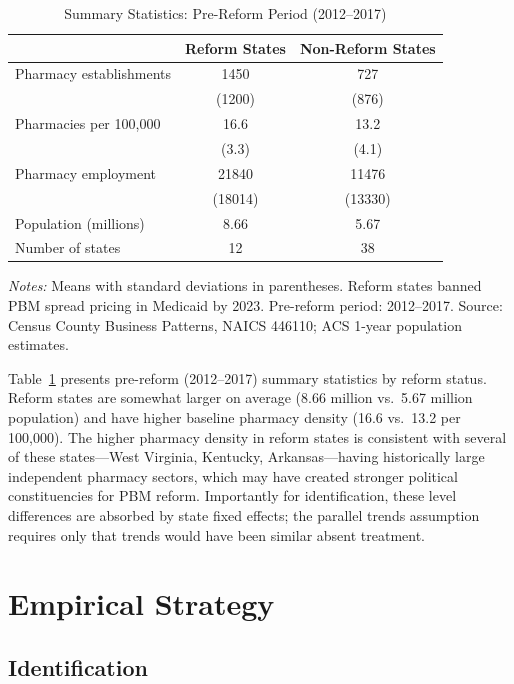 \documentclass[12pt]{article}
\begin{document}
\begin{table}[htbp]
\centering
\caption{Summary Statistics: Pre-Reform Period (2012--2017)}
\label{tab:summary}
\begin{threeparttable}
\begin{tabular}{lcc}
\toprule
 & Reform States & Non-Reform States \\
\midrule
Pharmacy establishments & 1450 & 727 \\
 & (1200) & (876) \\
Pharmacies per 100,000 & 16.6 & 13.2 \\
 & (3.3) & (4.1) \\
Pharmacy employment & 21840 & 11476 \\
 & (18014) & (13330) \\
Population (millions) & 8.66 & 5.67 \\
Number of states & 12 & 38 \\
\bottomrule
\end{tabular}
\begin{tablenotes}[flushleft]\small
\item \textit{Notes:} Means with standard deviations in parentheses. Reform states banned PBM spread pricing in Medicaid by 2023. Pre-reform period: 2012--2017. Source: Census County Business Patterns, NAICS 446110; ACS 1-year population estimates.
\end{tablenotes}
\end{threeparttable}
\end{table}

Table~\ref{tab:summary} presents pre-reform (2012--2017) summary statistics by reform status. Reform states are somewhat larger on average (8.66 million vs.\ 5.67 million population) and have higher baseline pharmacy density (16.6 vs.\ 13.2 per 100,000). The higher pharmacy density in reform states is consistent with several of these states---West Virginia, Kentucky, Arkansas---having historically large independent pharmacy sectors, which may have created stronger political constituencies for PBM reform. Importantly for identification, these level differences are absorbed by state fixed effects; the parallel trends assumption requires only that trends would have been similar absent treatment.

\section{Empirical Strategy}

\subsection{Identification}
\end{document}
